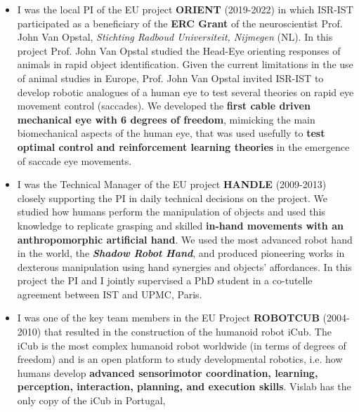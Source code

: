 \begin{itemize}
  \textbf{monitoring of critical infrastructures} (bridges, buildings,
  dams), \textbf{wildfires in the national forest}, and for the
  \textbf{surveillance of maritime events} like illegal naval traffic
  and pollution spots. These projects developed strong links with the
  \textbf{Naval School} and the \textbf{Air Force Academy}, as well as
  with national technological companies like \textbf{Tekever},
  \textbf{UAVision}, and \textbf{Critical Software}.
\item
  I was the local PI of the EU project \textbf{ORIENT} (2019-2022) in
  which ISR-IST participated as a beneficiary of the \textbf{ERC Grant}
  of the neuroscientist Prof. John Van Opstal, \emph{Stichting Radboud
  Universiteit, Nijmegen} (NL). In this project Prof. John Van Opstal
  studied the Head-Eye orienting responses of animals in rapid object
  identification. Given the current limitations in the use of animal
  studies in Europe, Prof. John Van Opstal invited ISR-IST to develop
  robotic analogues of a human eye to test several theories on rapid eye
  movement control (saccades). We developed the \textbf{first cable
  driven mechanical eye with 6 degrees of freedom}, mimicking the main
  biomechanical aspects of the human eye, that was used usefully to
  \textbf{test optimal control and reinforcement learning theories} in
  the emergence of saccade eye movements.
\item
  I was the Technical Manager of the EU project \textbf{HANDLE}
  (2009-2013) closely supporting the PI in daily technical decisions on
  the project. We studied how humans perform the manipulation of objects
  and used this knowledge to replicate grasping and skilled
  \textbf{in-hand movements with an anthropomorphic artificial hand}. We
  used the most advanced robot hand in the world, the
  \emph{\textbf{Shadow Robot Hand}}, and produced pioneering works in
  dexterous manipulation using hand synergies and objects' affordances.
  In this project the PI and I jointly supervised a PhD student in a
  co-tutelle agreement between IST and UPMC, Paris.
\item
  I was one of the key team members in the EU Project \textbf{ROBOTCUB}
  (2004-2010) that resulted in the construction of the humanoid robot
  iCub. The iCub is the most complex humanoid robot worldwide (in terms
  of degrees of freedom) and is an open platform to study developmental
  robotics, i.e. how humans develop \textbf{advanced sensorimotor
  coordination, learning, perception, interaction, planning, and
  execution skills}. Vislab has the only copy of the iCub in Portugal,

\end{itemize}
